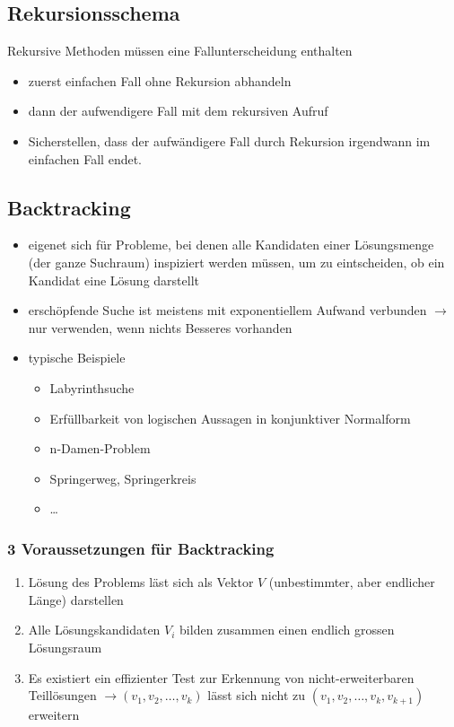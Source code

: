 \documentclass[a4paper,10pt]{article}
\begin{document}
\subsection{Rekursionsschema}
Rekursive Methoden m\"ussen eine Fallunterscheidung enthalten
\begin{itemize}
\item zuerst einfachen Fall ohne Rekursion abhandeln
\item dann der aufwendigere Fall mit dem rekursiven Aufruf
\item Sicherstellen, dass der aufwändigere Fall durch Rekursion irgendwann im einfachen Fall endet.
\end{itemize}


\subsection{Backtracking}
\begin{itemize}
\item eigenet sich f\"ur Probleme, bei denen alle Kandidaten einer L\"osungsmenge (der ganze Suchraum) inspiziert werden m\"ussen, um zu eintscheiden, ob ein Kandidat eine L\"osung darstellt
\item ersch\"opfende Suche ist meistens mit exponentiellem Aufwand verbunden $\to$ nur verwenden, wenn nichts Besseres vorhanden
\item typische Beispiele
	\begin{itemize}
	\item Labyrinthsuche
	\item Erf\"ullbarkeit von logischen Aussagen in konjunktiver Normalform
	\item n-Damen-Problem
	\item Springerweg, Springerkreis
	\item \dots
	\end{itemize}
\end{itemize}

\subsubsection{3 Voraussetzungen f\"ur Backtracking}
\begin{enumerate}
\item L\"osung des Problems l\"ast sich als Vektor $V$ (unbestimmter, aber endlicher L\"ange) darstellen
\item Alle L\"osungskandidaten $V_i$ bilden zusammen einen endlich grossen L\"osungsraum
\item Es existiert ein effizienter Test zur Erkennung von nicht-erweiterbaren Teill\"osungen $\to(v_1,v_2,\dots,v_k)$ l\"asst sich nicht zu $(v_1,v_2,\dots,v_k,v_{k+1})$ erweitern
\end{enumerate}
\end{document}
